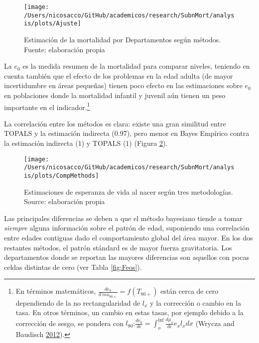 \documentclass[12pt,]{article}
\begin{document}
\begin{figure}

{\centering \texttt{[image: /Users/nicosacco/GitHub/academicos/research/SubnMort/analysis/plots/Ajuste]} 

}

\caption{Estimación de la mortalidad por Departamentos según métodos. Fuente: elaboración propia}\label{fig:Ajuste}
\end{figure}

La \(e_0\) es la medida resumen de la mortalidad para comparar niveles,
teniendo en cuenta también que el efecto de los problemas en la edad
adulta (de mayor incertidumbre en áreas pequeñas) tienen poco efecto en
las estimaciones sobre \(e_0\) en poblaciones donde la mortalidad
infantil y juvenil aún tienen un peso importante en el
indicador.\footnote{En términos matemáticos,
  \(\frac{de_0} {d \ mu_ {80 +}} = f (T_ {80 +})\) están cerca de cero
  dependiendo de la no rectangularidad de \(l_x\) y la corrección o
  cambio en la tasa. En otros términos, un cambio en estas tasas, por
  ejemplo debido a la corrección de sesgo, se pondera con
  \(l_{80}\):\(\frac{de_0} {d \epsilon} = \int_{o}^{\inf}{\frac{d\mu_x} {d \epsilon} e_x l_x dx}\)
  (Wrycza and Baudisch \protect\hyperlink{ref-Wrycza2012}{2012}).}

La correlación entre los métodos es clara: existe una gran similitud
entre TOPALS y la estimación indirecta (0.97), pero menor en Bayes
Empírico contra la estimación indirecta (1) y TOPALS (1) (Figura
\ref{fig:comparativeMeth}).

\begin{figure}

{\centering \texttt{[image: /Users/nicosacco/GitHub/academicos/research/SubnMort/analysis/plots/CompMethods]} 

}

\caption{Estimaciones de esperanza de vida al nacer según tres metodologías. Source: elaboración propia}\label{fig:comparativeMeth}
\end{figure}

Las principales diferencias se deben a que el método bayesiano tiende a
tomar \emph{siempre} alguna información sobre el patrón de edad,
suponiendo una correlación entre edades contiguas dado el comportamiento
global del área mayor. En los dos restantes métodos, el patrón stándard
es de mayor fuerza gravitatoria. Los departamentos donde se reportan las
mayores diferencias son aquellos con pocas celdas distintas de cero (ver
Tabla \ref{fig:Feos}).
\end{document}
